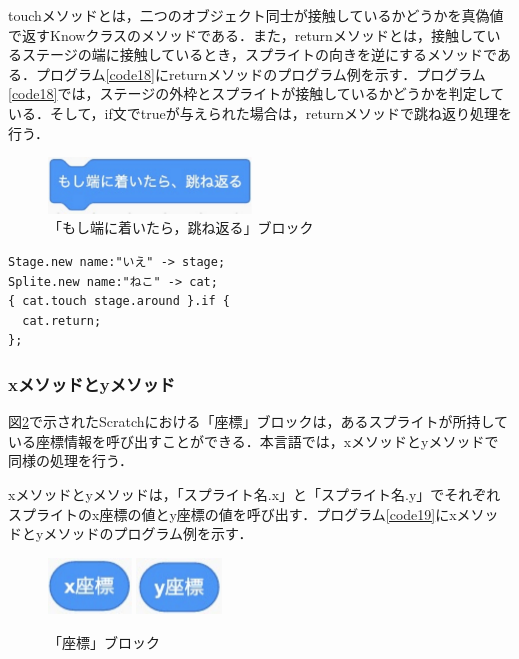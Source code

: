 \documentclass[10pt,a4j]{ltjsarticle}
\begin{document}
touchメソッドとは，二つのオブジェクト同士が接触しているかどうかを真偽値で返すKnowクラスのメソッドである．また，returnメソッドとは，接触しているステージの端に接触しているとき，スプライトの向きを逆にするメソッドである．プログラム\ref{code18}にreturnメソッドのプログラム例を示す．プログラム\ref{code18}では，ステージの外枠とスプライトが接触しているかどうかを判定している．そして，if文でtrueが与えられた場合は，returnメソッドで跳ね返り処理を行う．

\begin{figure}[H]
  \centering
  \includegraphics[height=15mm]{images/return.pdf}
  \caption{「もし端に着いたら，跳ね返る」ブロック}
  \label{fig:return}
\end{figure}

\begin{lstlisting}[caption=returnメソッドのプログラム例, label=code18]
Stage.new name:"いえ" -> stage;
Splite.new name:"ねこ" -> cat;
{ cat.touch stage.around }.if {
  cat.return;
};
\end{lstlisting}

\subsubsection{xメソッドとyメソッド}
図\ref{fig:xy}で示されたScratchにおける「座標」ブロックは，あるスプライトが所持している座標情報を呼び出すことができる．本言語では，xメソッドとyメソッドで同様の処理を行う．

xメソッドとyメソッドは，「スプライト名.x」と「スプライト名.y」でそれぞれスプライトのx座標の値とy座標の値を呼び出す．プログラム\ref{code19}にxメソッドとyメソッドのプログラム例を示す．

\begin{figure}[H]
  \centering
  \includegraphics[height=15mm]{images/x.pdf} 
  \includegraphics[height=15mm]{images/y.pdf} 
  \caption{「座標」ブロック}
  \label{fig:xy}
\end{figure}
\end{document}

